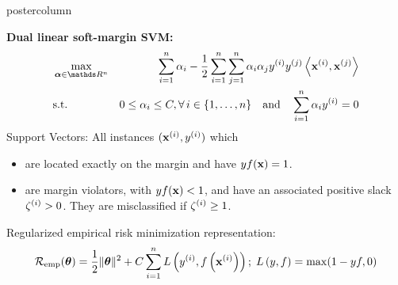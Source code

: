 \documentclass{beamer}
\begin{document}
\begin{frame}[fragile]{}
\begin{columns}
\begin{column}{.31\textwidth}
\begin{beamercolorbox}[center]{postercolumn}
\begin{minipage}{.98\textwidth}
{\begin{myblock}{}
							\textbf{Dual linear soft-margin SVM:} 	
							\begin{eqnarray*}
								& \max\limits_{\alphav \in \R^n} & \sum_{i=1}^n \alpha_i - \frac{1}{2}\sum_{i=1}^n\sum_{j=1}^n\alpha_i\alpha_j\yi y^{(j)} \scp{\xi}{\xv^{(j)}} \\
								& \text{s.t. } & 0 \le \alpha_i \le C, \forall\, i \in \nset \quad \text{and} \quad  \sum_{i=1}^n \alpha_i \yi = 0
							\end{eqnarray*}
						Support Vectors: All instances $(\mathbf{x}^{(i)}, y^{(i)})$ which 
						\begin{itemize}
							\setlength{\itemindent}{+.3in}
							\item are located exactly on the
							margin and have $yf(\mathbf{x})=1$.
							\item are margin violators, with $yf(\mathbf{x}) < 1$, and have an associated positive slack $\zeta^{(i)} > 0$. 
							They are misclassified if $\zeta^{(i)} \geq 1$.
						\end{itemize}
						Regularized empirical risk minimization representation:
						$$ \mathcal{R}_{\text{emp}}(\bm{\theta}) = \frac{1}{2} \|\bm{\theta}\|^2 + C \sum\limits_{i=1}^n L\left(y^{(i)}, f\left(\mathbf{x}^{(i)}\right)\right) ;\; L\left(y, f\right) = \max(1-yf, 0)$$

						\end{myblock}

}
\end{minipage}
\end{beamercolorbox}
\end{column}
\end{columns}
\end{frame}
\end{document}
